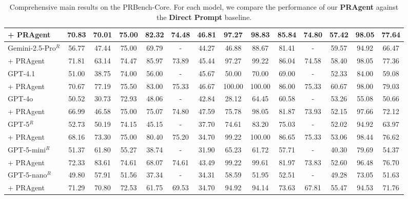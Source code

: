 \begin{table*}[t!]
{\begin{tabular}{l|cc|cccccc|cccc|c}
\rowcolor[rgb]{0.928, 0.936, 0.997}
+ PRAgent & 70.83 & 70.01 & 75.00 & 82.32 & 74.48 & 46.81 & 97.27 & 98.83 & 85.84 & 74.80 & 57.42 & 98.05 & 77.64 \\
\midrule
Gemini-2.5-Pro$^{R}$ & 56.77 & 47.44 & 75.00 & 69.79 & - & 44.27 & 46.88 & 88.67 & 81.41 & - & 59.57 & 94.92 & 66.47 \\
\rowcolor[rgb]{0.928, 0.936, 0.997}
+ PRAgent & 71.81 & 63.14 & 74.47 & 85.97 & 73.89 & 45.44 & 97.27 & 99.22 & 86.04 & 74.58 & 58.40 & 98.05 & 77.36 \\
\midrule
GPT-4.1 & 51.00 & 38.75 & 74.00 & 56.00 & - & 45.67 & 50.00 & 70.00 & 69.00 & - & 52.33 & 84.00 & 59.08 \\
\rowcolor[rgb]{0.928, 0.936, 0.997}
+ PRAgent & 70.67 & 77.19 & 75.50 & 83.00 & 75.33 & 46.67 & 100.00 & 100.00 & 86.00 & 75.33 & 60.67 & 98.00 & 79.03 \\
\midrule
GPT-4o & 50.52 & 30.73 & 72.93 & 48.06 & - & 42.84 & 28.12 & 64.45 & 60.58 & - & 53.26 & 55.08 & 50.66 \\
\rowcolor[rgb]{0.928, 0.936, 0.997}
+ PRAgent & 66.99 & 46.58 & 75.00 & 75.07 & 74.80 & 47.59 & 75.78 & 98.05 & 81.87 & 73.93 & 52.15 & 97.66 & 72.12 \\
\midrule
GPT-5$^{R}$ & 52.73 & 50.19 & 74.15 & 45.15 & - & 37.70 & 74.61 & 83.20 & 75.03 & - & 52.02 & 94.92 & 63.97 \\
\rowcolor[rgb]{0.928, 0.936, 0.997}
+ PRAgent & 68.16 & 73.30 & 75.00 & 80.40 & 75.20 & 34.70 & 99.22 & 100.00 & 86.65 & 75.33 & 53.06 & 98.44 & 76.62 \\
\midrule
GPT-5-mini$^{R}$ & 51.37 & 61.80 & 55.27 & 38.74 & - & 31.90 & 65.23 & 61.72 & 57.71 & - & 40.30 & 79.69 & 54.37 \\
\rowcolor[rgb]{0.928, 0.936, 0.997}
+ PRAgent & 72.33 & 83.61 & 74.61 & 68.07 & 74.61 & 43.49 & 99.22 & 99.61 & 81.97 & 73.83 & 52.60 & 96.48 & 76.70 \\
\midrule
GPT-5-nano$^{R}$ & 49.80 & 57.91 & 51.56 & 37.34 & - & 34.31 & 58.59 & 51.95 & 52.51 & - & 49.28 & 73.05 & 51.63 \\
\rowcolor[rgb]{0.928, 0.936, 0.997}
+ PRAgent & 71.29 & 70.80 & 72.53 & 61.75 & 69.53 & 34.70 & 94.92 & 94.14 & 73.63 & 67.81 & 55.47 & 94.53 & 71.76 \\
\bottomrule
\end{tabular}%
}
\caption{Comprehensive main results on the PRBench-Core. For each model, we compare the performance of our \textbf{PRAgent} against the \textbf{Direct Prompt} baseline.}
\label{tab:pragent}
\end{table*}


